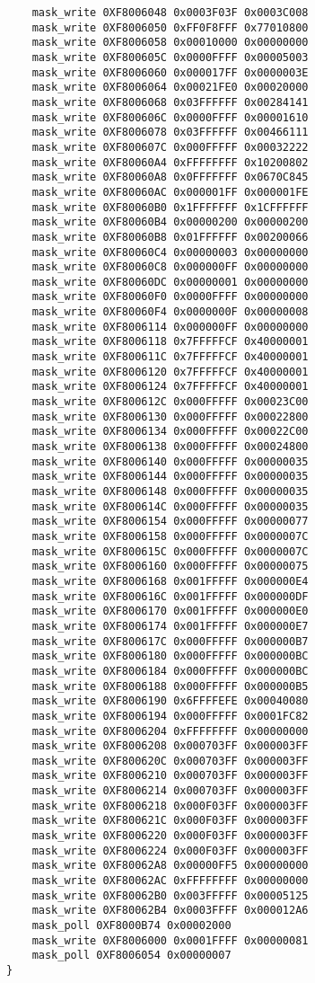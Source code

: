\begin{lstlisting}
    mask_write 0XF8006048 0x0003F03F 0x0003C008
    mask_write 0XF8006050 0xFF0F8FFF 0x77010800
    mask_write 0XF8006058 0x00010000 0x00000000
    mask_write 0XF800605C 0x0000FFFF 0x00005003
    mask_write 0XF8006060 0x000017FF 0x0000003E
    mask_write 0XF8006064 0x00021FE0 0x00020000
    mask_write 0XF8006068 0x03FFFFFF 0x00284141
    mask_write 0XF800606C 0x0000FFFF 0x00001610
    mask_write 0XF8006078 0x03FFFFFF 0x00466111
    mask_write 0XF800607C 0x000FFFFF 0x00032222
    mask_write 0XF80060A4 0xFFFFFFFF 0x10200802
    mask_write 0XF80060A8 0x0FFFFFFF 0x0670C845
    mask_write 0XF80060AC 0x000001FF 0x000001FE
    mask_write 0XF80060B0 0x1FFFFFFF 0x1CFFFFFF
    mask_write 0XF80060B4 0x00000200 0x00000200
    mask_write 0XF80060B8 0x01FFFFFF 0x00200066
    mask_write 0XF80060C4 0x00000003 0x00000000
    mask_write 0XF80060C8 0x000000FF 0x00000000
    mask_write 0XF80060DC 0x00000001 0x00000000
    mask_write 0XF80060F0 0x0000FFFF 0x00000000
    mask_write 0XF80060F4 0x0000000F 0x00000008
    mask_write 0XF8006114 0x000000FF 0x00000000
    mask_write 0XF8006118 0x7FFFFFCF 0x40000001
    mask_write 0XF800611C 0x7FFFFFCF 0x40000001
    mask_write 0XF8006120 0x7FFFFFCF 0x40000001
    mask_write 0XF8006124 0x7FFFFFCF 0x40000001
    mask_write 0XF800612C 0x000FFFFF 0x00023C00
    mask_write 0XF8006130 0x000FFFFF 0x00022800
    mask_write 0XF8006134 0x000FFFFF 0x00022C00
    mask_write 0XF8006138 0x000FFFFF 0x00024800
    mask_write 0XF8006140 0x000FFFFF 0x00000035
    mask_write 0XF8006144 0x000FFFFF 0x00000035
    mask_write 0XF8006148 0x000FFFFF 0x00000035
    mask_write 0XF800614C 0x000FFFFF 0x00000035
    mask_write 0XF8006154 0x000FFFFF 0x00000077
    mask_write 0XF8006158 0x000FFFFF 0x0000007C
    mask_write 0XF800615C 0x000FFFFF 0x0000007C
    mask_write 0XF8006160 0x000FFFFF 0x00000075
    mask_write 0XF8006168 0x001FFFFF 0x000000E4
    mask_write 0XF800616C 0x001FFFFF 0x000000DF
    mask_write 0XF8006170 0x001FFFFF 0x000000E0
    mask_write 0XF8006174 0x001FFFFF 0x000000E7
    mask_write 0XF800617C 0x000FFFFF 0x000000B7
    mask_write 0XF8006180 0x000FFFFF 0x000000BC
    mask_write 0XF8006184 0x000FFFFF 0x000000BC
    mask_write 0XF8006188 0x000FFFFF 0x000000B5
    mask_write 0XF8006190 0x6FFFFEFE 0x00040080
    mask_write 0XF8006194 0x000FFFFF 0x0001FC82
    mask_write 0XF8006204 0xFFFFFFFF 0x00000000
    mask_write 0XF8006208 0x000703FF 0x000003FF
    mask_write 0XF800620C 0x000703FF 0x000003FF
    mask_write 0XF8006210 0x000703FF 0x000003FF
    mask_write 0XF8006214 0x000703FF 0x000003FF
    mask_write 0XF8006218 0x000F03FF 0x000003FF
    mask_write 0XF800621C 0x000F03FF 0x000003FF
    mask_write 0XF8006220 0x000F03FF 0x000003FF
    mask_write 0XF8006224 0x000F03FF 0x000003FF
    mask_write 0XF80062A8 0x00000FF5 0x00000000
    mask_write 0XF80062AC 0xFFFFFFFF 0x00000000
    mask_write 0XF80062B0 0x003FFFFF 0x00005125
    mask_write 0XF80062B4 0x0003FFFF 0x000012A6
    mask_poll 0XF8000B74 0x00002000
    mask_write 0XF8006000 0x0001FFFF 0x00000081
    mask_poll 0XF8006054 0x00000007
}


\end{lstlisting}
